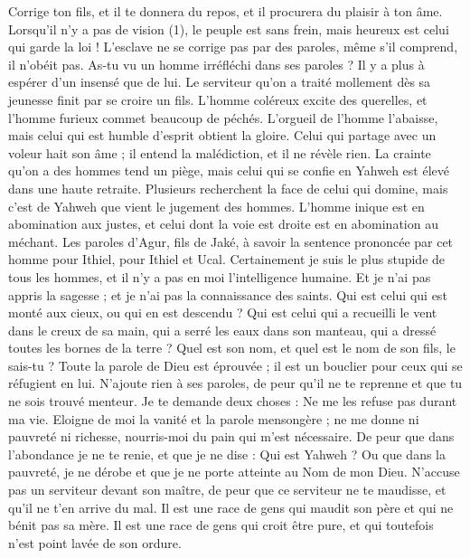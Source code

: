 \begin{multicols}{2}
Corrige ton fils, et il te donnera du repos, et il procurera du plaisir à ton âme.
Lorsqu'il n'y a pas de vision (1), le peuple est sans frein, mais heureux est celui qui garde la loi !
L’esclave ne se corrige pas par des paroles, même s’il comprend, il n’obéit pas.
As-tu vu un homme irréfléchi dans ses paroles ? Il y a plus à espérer d’un insensé que de lui.
Le serviteur qu’on a traité mollement dès sa jeunesse finit par se croire un fils.
L'homme coléreux excite des querelles, et l'homme furieux commet beaucoup de péchés.
L'orgueil de l'homme l'abaisse, mais celui qui est humble d'esprit obtient la gloire.
Celui qui partage avec un voleur hait son âme ; il entend la malédiction, et il ne révèle rien.
La crainte qu’on a des hommes tend un piège, mais celui qui se confie en Yahweh est élevé dans une haute retraite.
Plusieurs recherchent la face de celui qui domine, mais c'est de Yahweh que vient le jugement des hommes.
L'homme inique est en abomination aux justes, et celui dont la voie est droite est en abomination au méchant.
\VerseOne{}Les paroles d'Agur, fils de Jaké, à savoir la sentence prononcée par cet homme pour Ithiel, pour Ithiel et Ucal.
Certainement je suis le plus stupide de tous les hommes, et il n'y a pas en moi l’intelligence humaine.
Et je n'ai pas appris la sagesse ; et je n’ai pas la connaissance des saints.
Qui est celui qui est monté aux cieux, ou qui en est descendu ? Qui est celui qui a recueilli le vent dans le creux de sa main, qui a serré les eaux dans son manteau, qui a dressé toutes les bornes de la terre ? Quel est son nom, et quel est le nom de son fils, le sais-tu ?
Toute la parole de Dieu est éprouvée ; il est un bouclier pour ceux qui se réfugient en lui.
N'ajoute rien à ses paroles, de peur qu'il ne te reprenne et que tu ne sois trouvé menteur.
Je te demande deux choses : Ne me les refuse pas durant ma vie.
Eloigne de moi la vanité et la parole mensongère ; ne me donne ni pauvreté ni richesse, nourris-moi du pain qui m’est nécessaire.
De peur que dans l’abondance je ne te renie, et que je ne dise : Qui est Yahweh ? Ou que dans la pauvreté, je ne dérobe et que je ne porte atteinte au Nom de mon Dieu.
N’accuse pas un serviteur devant son maître, de peur que ce serviteur ne te maudisse, et qu'il ne t'en arrive du mal.
Il est une race de gens qui maudit son père et qui ne bénit pas sa mère.
Il est une race de gens qui croit être pure, et qui toutefois n'est point lavée de son ordure.

\end{multicols}

